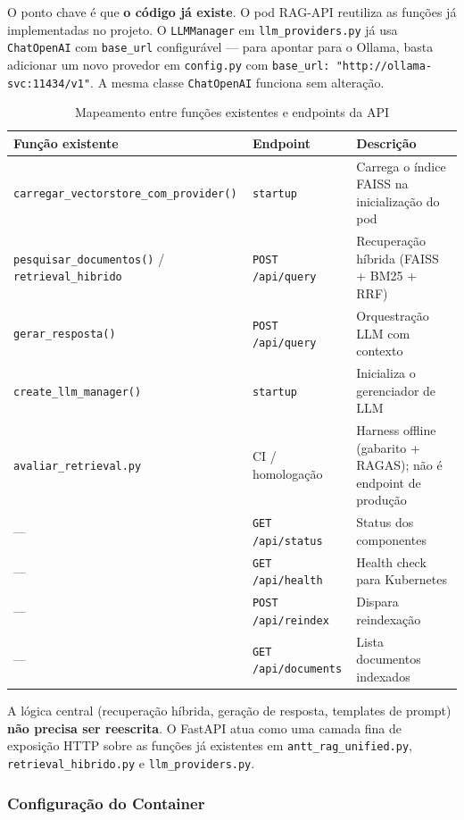 \documentclass[12pt, a4paper]{article}
\begin{document}
O ponto chave é que \textbf{o código já existe}. O pod RAG-API reutiliza as funções já implementadas no projeto. O \texttt{LLMManager} em \texttt{llm\_providers.py} já usa \texttt{ChatOpenAI} com \texttt{base\_url} configurável --- para apontar para o Ollama, basta adicionar um novo provedor em \texttt{config.py} com \texttt{base\_url: "http://ollama-svc:11434/v1"}. A mesma classe \texttt{ChatOpenAI} funciona sem alteração.

\begin{table}[H]
\centering
\small
\caption{Mapeamento entre funções existentes e endpoints da API}
\label{tab:mapeamento}
\begin{tabularx}{\textwidth}{l l X}
\toprule
\textbf{Função existente} & \textbf{Endpoint} & \textbf{Descrição} \\
\midrule
\texttt{carregar\_vectorstore\_com\_provider()} & \texttt{startup} & Carrega o índice FAISS na inicialização do pod \\
\texttt{pesquisar\_documentos()} / \texttt{retrieval\_hibrido} & \texttt{POST /api/query} & Recuperação híbrida (FAISS + BM25 + RRF) \\
\texttt{gerar\_resposta()} & \texttt{POST /api/query} & Orquestração LLM com contexto \\
\texttt{create\_llm\_manager()} & \texttt{startup} & Inicializa o gerenciador de LLM \\
\texttt{avaliar\_retrieval.py} & CI / homologação & Harness offline (gabarito + RAGAS); não é endpoint de produção \\
--- & \texttt{GET /api/status} & Status dos componentes \\
--- & \texttt{GET /api/health} & Health check para Kubernetes \\
--- & \texttt{POST /api/reindex} & Dispara reindexação \\
--- & \texttt{GET /api/documents} & Lista documentos indexados \\
\bottomrule
\end{tabularx}
\end{table}

A lógica central (recuperação híbrida, geração de resposta, templates de prompt) \textbf{não precisa ser reescrita}. O FastAPI atua como uma camada fina de exposição HTTP sobre as funções já existentes em \texttt{antt\_rag\_unified.py}, \texttt{retrieval\_hibrido.py} e \texttt{llm\_providers.py}.

\subsubsection*{Configuração do Container}
\end{document}
